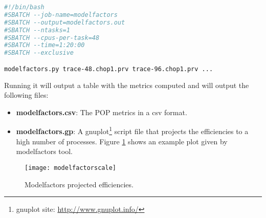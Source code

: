 \begin{lstlisting}[language=sh, caption={Running modelfactors with SLURM.}, label={modelfactorslst}]
#!/bin/bash
#SBATCH --job-name=modelfactors
#SBATCH --output=modelfactors.out
#SBATCH --ntasks=1
#SBATCH --cpus-per-task=48
#SBATCH --time=1:20:00
#SBATCH --exclusive

modelfactors.py trace-48.chop1.prv trace-96.chop1.prv ...
\end{lstlisting}

Running it will output a table with the metrics computed and will output the following files:
\begin{itemize}
  \item \textbf{modelfactors.csv}: The POP metrics in a csv format.
  \item \textbf{modelfactors.gp}: A gnuplot\footnote{gnuplot site: \url{http://www.gnuplot.info/}} script file that projects the efficiencies to a high number of processes. Figure \ref{mfscaling} shows an example plot given by modelfactors tool.
\end{itemize}

\begin{figure}[htbp]
  \centering
  \texttt{[image: modelfactorscale]}
  \caption{Modelfactors projected efficiencies.}
  \label{mfscaling}
\end{figure}

